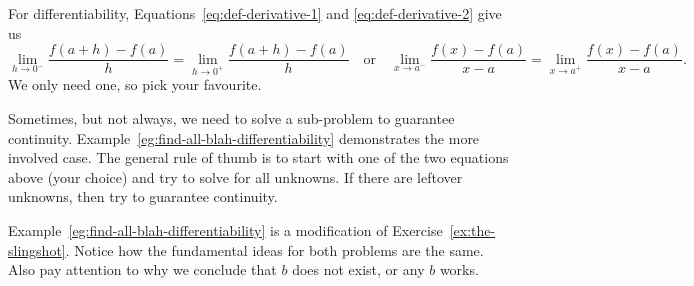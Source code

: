 \documentclass[../main.tex]{subfiles}
\begin{document}
%
%
%
%
%
\clearpage

For differentiability, Equations~\eqref{eq:def-derivative-1} and \eqref{eq:def-derivative-2} give us
\[
  \lim_{h \to 0^{-}} \frac{f(a + h) - f(a)}{h} = \lim_{h \to 0^{+}} \frac{f(a + h) - f(a)}{h}
  \quad\text{or}\quad
  \lim_{x \to a^{-}} \frac{f(x) - f(a)}{x - a} = \lim_{x \to a^{+}} \frac{f(x) - f(a)}{x - a}.
\]
We only need one, so pick your favourite.

Sometimes, but not always, we need to solve a sub-problem to guarantee continuity. Example~\ref{eg:find-all-blah-differentiability} demonstrates the more involved case.  The general rule of thumb is to start with one of the two equations above (your choice) and try to solve for all unknowns.  If there are leftover unknowns, then try to guarantee continuity.

Example~\ref{eg:find-all-blah-differentiability} is a modification of Exercise~\ref{ex:the-slingshot}. Notice how the fundamental ideas for both problems are the same. Also pay attention to why we  conclude that \(b\) does not exist, or any \(b\) works.
\end{document}
